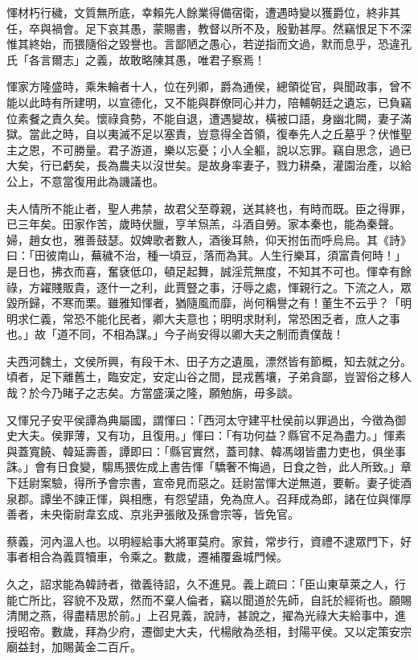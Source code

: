 \begin{pinyinscope}
惲材朽行穢，文質無所底，幸賴先人餘業得備宿衛，遭遇時變以獲爵位，終非其任，卒與禍會。足下哀其愚，蒙賜書，教督以所不及，殷勤甚厚。然竊恨足下不深惟其終始，而猥隨俗之毀譽也。言鄙陋之愚心，若逆指而文過，默而息乎，恐違孔氏「各言爾志」之義，故敢略陳其愚，唯君子察焉！

惲家方隆盛時，乘朱輪者十人，位在列卿，爵為通侯，總領從官，與聞政事，曾不能以此時有所建明，以宣德化，又不能與群僚同心并力，陪輔朝廷之遺忘，已負竊位素餐之責久矣。懷祿貪勢，不能自退，遭遇變故，橫被口語，身幽北闕，妻子滿獄。當此之時，自以夷滅不足以塞責，豈意得全首領，復奉先人之丘墓乎？伏惟聖主之恩，不可勝量。君子游道，樂以忘憂；小人全軀，說以忘罪。竊自思念，過已大矣，行已虧矣，長為農夫以沒世矣。是故身率妻子，戮力耕桑，灌園治產，以給公上，不意當復用此為譏議也。

夫人情所不能止者，聖人弗禁，故君父至尊親，送其終也，有時而既。臣之得罪，已三年矣。田家作苦，歲時伏臘，亨羊炰羔，斗酒自勞。家本秦也，能為秦聲。婦，趙女也，雅善鼓瑟。奴婢歌者數人，酒後耳熱，仰天拊缶而呼烏烏。其《詩》曰：「田彼南山，蕪穢不治，種一頃豆，落而為萁。人生行樂耳，須富貴何時！」是日也，拂衣而喜，奮褎低卬，頓足起舞，誠淫荒無度，不知其不可也。惲幸有餘祿，方糴賤販貴，逐什一之利，此賈豎之事，汙辱之處，惲親行之。下流之人，眾毀所歸，不寒而栗。雖雅知惲者，猶隨風而靡，尚何稱譽之有！董生不云乎？「明明求仁義，常恐不能化民者，卿大夫意也；明明求財利，常恐困乏者，庶人之事也。」故「道不同，不相為謀。」今子尚安得以卿大夫之制而責僕哉！

夫西河魏土，文侯所興，有段干木、田子方之遺風，漂然皆有節概，知去就之分。頃者，足下離舊土，臨安定，安定山谷之間，昆戎舊壤，子弟貪鄙，豈習俗之移人哉？於今乃睹子之志矣。方當盛漢之隆，願勉旃，毋多談。

又惲兄子安平侯譚為典屬國，謂惲曰：「西河太守建平杜侯前以罪過出，今徵為御史大夫。侯罪薄，又有功，且復用。」惲曰：「有功何益？縣官不足為盡力。」惲素與蓋寬饒、韓延壽善，譚即曰：「縣官實然，蓋司隸、韓馮翊皆盡力吏也，俱坐事誅。」會有日食變，騶馬猥佐成上書告惲「驕奢不悔過，日食之咎，此人所致。」章下廷尉案驗，得所予會宗書，宣帝見而惡之。廷尉當惲大逆無道，要斬。妻子徙酒泉郡。譚坐不諫正惲，與相應，有怨望語，免為庶人。召拜成為郎，諸在位與惲厚善者，未央衛尉韋玄成、京兆尹張敞及孫會宗等，皆免官。

蔡義，河內溫人也。以明經給事大將軍莫府。家貧，常步行，資禮不逮眾門下，好事者相合為義買犢車，令乘之。數歲，遷補覆盎城門候。

久之，詔求能為韓詩者，徵義待詔，久不進見。義上疏曰：「臣山東草萊之人，行能亡所比，容貌不及眾，然而不棄人倫者，竊以聞道於先師，自託於經術也。願賜清閒之燕，得盡精思於前。」上召見義，說詩，甚說之，擢為光祿大夫給事中，進授昭帝。數歲，拜為少府，遷御史大夫，代楊敞為丞相，封陽平侯。又以定策安宗廟益封，加賜黃金二百斤。


\end{pinyinscope}
